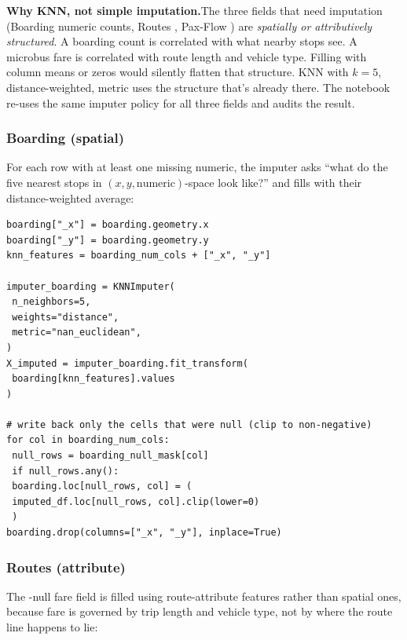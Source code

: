 \begin{callout}
\textbf{\color{plotblue}Why KNN, not simple imputation.}\quad The three
fields that need imputation (Boarding numeric counts, Routes ,
Pax-Flow ) are \emph{spatially or
attributively structured}. A boarding count is correlated with what
nearby stops see. A microbus fare is correlated with route length and
vehicle type. Filling with column means or zeros would silently
flatten that structure. KNN with $k=5$, distance-weighted,
 metric uses the structure that's already there.
The notebook re-uses the same imputer policy for all three fields and
audits the result.
\end{callout}

\subsubsection{Boarding (spatial)}

For each row with at least one missing numeric, the imputer asks
``what do the five nearest stops in $(x, y, \text{numeric})$-space
look like?'' and fills with their distance-weighted average:

\begin{lstlisting}[caption={KNN imputation on Boarding stops, XY appended as features.}]
boarding["_x"] = boarding.geometry.x
boarding["_y"] = boarding.geometry.y
knn_features = boarding_num_cols + ["_x", "_y"]

imputer_boarding = KNNImputer(
 n_neighbors=5,
 weights="distance",
 metric="nan_euclidean",
)
X_imputed = imputer_boarding.fit_transform(
 boarding[knn_features].values
)

# write back only the cells that were null (clip to non-negative)
for col in boarding_num_cols:
 null_rows = boarding_null_mask[col]
 if null_rows.any():
 boarding.loc[null_rows, col] = (
 imputed_df.loc[null_rows, col].clip(lower=0)
 )
boarding.drop(columns=["_x", "_y"], inplace=True)
\end{lstlisting}

\subsubsection{Routes  (attribute)}

The -null fare field is filled using route-attribute
features rather than spatial ones, because fare is governed by trip
length and vehicle type, not by where the route line happens to lie:

